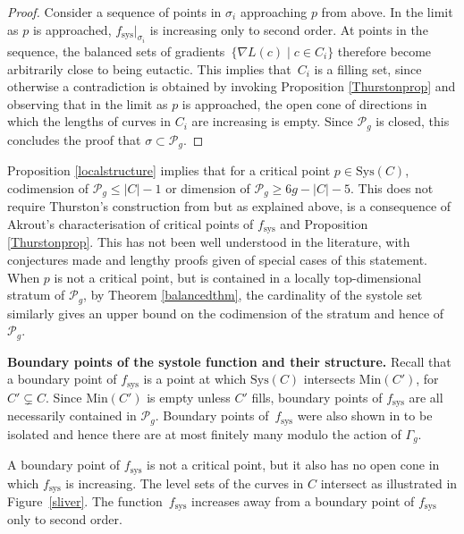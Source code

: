 \documentclass[pdftex]{sigma}
\numberwithin{equation}{section}
\begin{document}
\begin{proof}
Consider a sequence of points in $\sigma_{i}$ approaching $p$ from above. In the limit as $p$ is approached, $f_{\mathrm{sys}}|_{\sigma_{i}}$ is increasing only to second order. At points in the sequence, the balanced sets of gradients~$\{\nabla L(c) \mid c\in C_{i}\}$ therefore become arbitrarily close to being eutactic. This implies that~$C_{i}$ is a filling set, since otherwise a contradiction is obtained by invoking Proposition \ref{Thurstonprop} and observing that in the limit as $p$ is approached, the open cone of directions in which the lengths of curves in $C_{i}$ are increasing is empty. Since $\mathcal{P}_{g}$ is closed, this concludes the proof that $\sigma\subset \mathcal{P}_{g}$.
\end{proof}

\begin{Remark}
Proposition \ref{localstructure} implies that for a critical point $p\in \mathrm{Sys}(C)$,
codimension of $\mathcal{P}_{g} \leq |C|-1$ or dimension of $\mathcal{P}_{g}\geq 6g-|C|-5$.
This does not require Thurston's construction from \cite{Thurston} but as explained above, is a consequence of Akrout's characterisation of critical points of $f_{\mathrm{sys}}$ and Proposition \ref{Thurstonprop}. This has not been well understood in the literature, with conjectures made and lengthy proofs given of special cases of this statement. When $p$ is not a critical point, but is contained in a locally top-dimensional stratum of $\mathcal{P}_{g}$, by Theorem \ref{balancedthm}, the cardinality of the systole set similarly gives an upper bound on the codimension of the stratum and hence of~$\mathcal{P}_{g}$.
\end{Remark}

\textbf{Boundary points of the systole function and their structure.} Recall that a boundary point of $f_{\mathrm{sys}}$ is a point at which $\mathrm{Sys}(C)$ intersects $\mathrm{Min}(C')$, for $C'\subsetneq C$. Since $\mathrm{Min}(C')$ is empty unless $C'$ fills, boundary points of $f_{\mathrm{sys}}$ are all necessarily contained in $\mathcal{P}_{g}$. Boundary points of~$f_{\mathrm{sys}}$ were also shown in \cite{SchmutzMorse} to be isolated and hence there are at most finitely many modulo the action of $\Gamma_{g}$.

A boundary point of $f_{\mathrm{sys}}$ is not a critical point, but it also has no open cone in which $f_{\mathrm{sys}}$ is increasing. The level sets of the curves in $C$ intersect as illustrated in Figure~\ref{sliver}. The function~$f_{\mathrm{sys}}$ increases away from a boundary point of $f_{\mathrm{sys}}$ only to second order.
\end{document}
